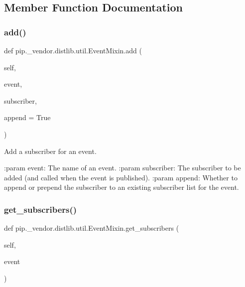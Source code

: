 \subsection{Member Function Documentation}
\mbox{\label{classpip_1_1__vendor_1_1distlib_1_1util_1_1EventMixin_a59395574411aaf4383687b2d5b0b9acd}} 
\subsubsection{\texorpdfstring{add()}{add()}}
{\footnotesize\ttfamily def pip.\+\_\+vendor.\+distlib.\+util.\+Event\+Mixin.\+add (\begin{DoxyParamCaption}\item[{}]{self,  }\item[{}]{event,  }\item[{}]{subscriber,  }\item[{}]{append = {\ttfamily True} }\end{DoxyParamCaption})}

\begin{DoxyVerb}Add a subscriber for an event.

:param event: The name of an event.
:param subscriber: The subscriber to be added (and called when the
           event is published).
:param append: Whether to append or prepend the subscriber to an
       existing subscriber list for the event.
\end{DoxyVerb}
 \mbox{\label{classpip_1_1__vendor_1_1distlib_1_1util_1_1EventMixin_af8db5a61bb5ef5276efd44d7c5d7a3e3}} 
\subsubsection{\texorpdfstring{get\+\_\+subscribers()}{get\_subscribers()}}
{\footnotesize\ttfamily def pip.\+\_\+vendor.\+distlib.\+util.\+Event\+Mixin.\+get\+\_\+subscribers (\begin{DoxyParamCaption}\item[{}]{self,  }\item[{}]{event }\end{DoxyParamCaption})}

